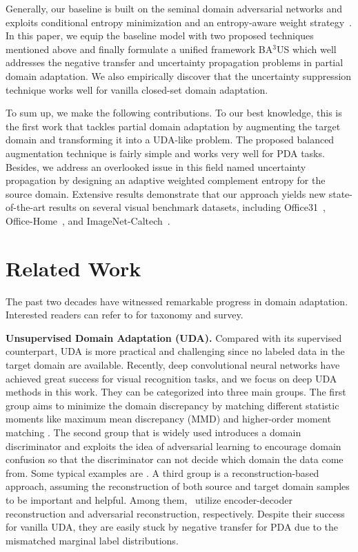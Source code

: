 \documentclass[runningheads]{llncs}
\begin{document}
Generally, our baseline is built on the seminal domain adversarial networks \cite{ganin2015unsupervised,ganin2016domain} and exploits conditional entropy minimization and an entropy-aware weight strategy~\cite{long2018conditional}.
In this paper, we equip the baseline model with two proposed techniques mentioned above and finally formulate a unified framework BA$^3$US which well addresses the negative transfer and uncertainty propagation problems in partial domain adaptation.
We also empirically discover that the uncertainty suppression technique works well for vanilla closed-set domain adaptation.


To sum up, we make the following contributions. To our best knowledge, this is the first work that tackles partial domain adaptation by augmenting the target domain and transforming it into a UDA-like problem. 
The proposed balanced augmentation technique is fairly simple and works very well for PDA tasks.
Besides, we address an overlooked issue in this field named uncertainty propagation by designing an adaptive weighted complement entropy for the source domain.
Extensive results demonstrate that our approach yields new state-of-the-art results on several visual benchmark datasets, including Office31~\cite{saenko2010adapting}, Office-Home~\cite{venkateswara2017deep}, and ImageNet-Caltech~\cite{cao2019learning}.


\section{Related Work}
The past two decades have witnessed remarkable progress in domain adaptation. Interested readers can refer to \cite{csurka2017domain,zhang2019transfer,kouw2019review} for taxonomy and survey. 


\textbf{Unsupervised Domain Adaptation (UDA).} 
Compared with its supervised counterpart, UDA is more practical and challenging since no labeled data in the target domain are available. 
Recently, deep convolutional neural networks have achieved great success for visual recognition tasks, and we focus on deep UDA methods in this work. They can be categorized into three main groups.
The first group aims to minimize the domain discrepancy by matching different statistic moments like maximum mean discrepancy (MMD) \cite{tzeng2014deep,long2015learning,long2017deep,liang2019aggregating} and higher-order moment matching \cite{sun2016deep,zellinger2016central,koniusz2017domain}.
The second group that is widely used introduces a domain discriminator and exploits the idea of adversarial learning \cite{goodfellow2014generative} to encourage domain confusion so that the discriminator can not decide which domain the data come from. 
Some typical examples are \cite{tzeng2015simultaneous,ganin2016domain,tzeng2017adversarial,bousmalis2017unsupervised}.
A third group is a reconstruction-based approach, assuming the reconstruction of both source and target domain samples to be important and helpful. Among them,~\cite{ghifary2016deep,zhu2017unpaired} utilize encoder-decoder reconstruction and adversarial reconstruction, respectively. 
Despite their success for vanilla UDA, they are easily stuck by negative transfer for PDA due to the mismatched marginal label distributions. 
\end{document}
